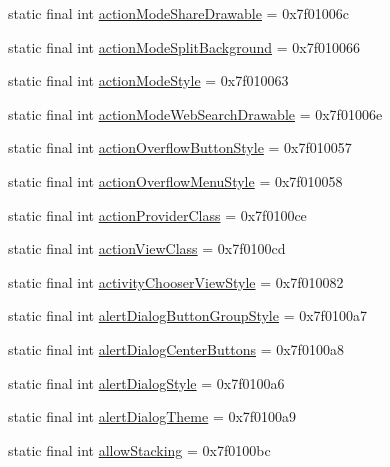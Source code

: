 \begin{CompactItemize}
\item 
static final int \hyperlink{classandroid_1_1support_1_1v4_1_1_r_1_1attr_74bfeff4f4b93bb08f62dc597c1bab17}{actionModeShareDrawable} = 0x7f01006c
\item 
static final int \hyperlink{classandroid_1_1support_1_1v4_1_1_r_1_1attr_893269c20db2085e7a5a35d46bab6008}{actionModeSplitBackground} = 0x7f010066
\item 
static final int \hyperlink{classandroid_1_1support_1_1v4_1_1_r_1_1attr_e0b4514a311cca4e01310c58c75bff64}{actionModeStyle} = 0x7f010063
\item 
static final int \hyperlink{classandroid_1_1support_1_1v4_1_1_r_1_1attr_3994d266fb3926aa161b7bcd436a8209}{actionModeWebSearchDrawable} = 0x7f01006e
\item 
static final int \hyperlink{classandroid_1_1support_1_1v4_1_1_r_1_1attr_61db9aa7bab56fc26dd2abec22905ce1}{actionOverflowButtonStyle} = 0x7f010057
\item 
static final int \hyperlink{classandroid_1_1support_1_1v4_1_1_r_1_1attr_5a9b799a3f7bda0187bbb2f2599370ef}{actionOverflowMenuStyle} = 0x7f010058
\item 
static final int \hyperlink{classandroid_1_1support_1_1v4_1_1_r_1_1attr_9fb06a1f50e16513cdf327c9daa4b666}{actionProviderClass} = 0x7f0100ce
\item 
static final int \hyperlink{classandroid_1_1support_1_1v4_1_1_r_1_1attr_e8e12aa0100c286bdcb37365452d7636}{actionViewClass} = 0x7f0100cd
\item 
static final int \hyperlink{classandroid_1_1support_1_1v4_1_1_r_1_1attr_526f9d9a2b7368052d192159f3e628d5}{activityChooserViewStyle} = 0x7f010082
\item 
static final int \hyperlink{classandroid_1_1support_1_1v4_1_1_r_1_1attr_ab161682434ffbc210eb483d22544342}{alertDialogButtonGroupStyle} = 0x7f0100a7
\item 
static final int \hyperlink{classandroid_1_1support_1_1v4_1_1_r_1_1attr_a6bfce1bed1fb7720cf2e5fc7a3d984e}{alertDialogCenterButtons} = 0x7f0100a8
\item 
static final int \hyperlink{classandroid_1_1support_1_1v4_1_1_r_1_1attr_6d37d12f2925d459ee03c54a948af972}{alertDialogStyle} = 0x7f0100a6
\item 
static final int \hyperlink{classandroid_1_1support_1_1v4_1_1_r_1_1attr_429fcb5f65db45c5f94b49b9dc967e8e}{alertDialogTheme} = 0x7f0100a9
\item 
static final int \hyperlink{classandroid_1_1support_1_1v4_1_1_r_1_1attr_c81ef96430e20895851010539d60c250}{allowStacking} = 0x7f0100bc

\end{CompactItemize}
